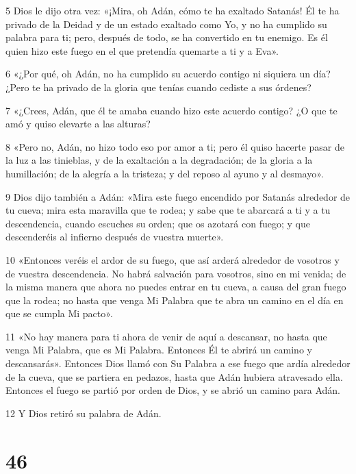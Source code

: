 \par 5 Dios le dijo otra vez: «¡Mira, oh Adán, cómo te ha exaltado Satanás! Él te ha privado de la Deidad y de un estado exaltado como Yo, y no ha cumplido su palabra para ti; pero, después de todo, se ha convertido en tu enemigo. Es él quien hizo este fuego en el que pretendía quemarte a ti y a Eva».

\par 6 «¿Por qué, oh Adán, no ha cumplido su acuerdo contigo ni siquiera un día? ¿Pero te ha privado de la gloria que tenías cuando cediste a sus órdenes?

\par 7 «¿Crees, Adán, que él te amaba cuando hizo este acuerdo contigo? ¿O que te amó y quiso elevarte a las alturas?

\par 8 «Pero no, Adán, no hizo todo eso por amor a ti; pero él quiso hacerte pasar de la luz a las tinieblas, y de la exaltación a la degradación; de la gloria a la humillación; de la alegría a la tristeza; y del reposo al ayuno y al desmayo».

\par 9 Dios dijo también a Adán: «Mira este fuego encendido por Satanás alrededor de tu cueva; mira esta maravilla que te rodea; y sabe que te abarcará a ti y a tu descendencia, cuando escuches su orden; que os azotará con fuego; y que descenderéis al infierno después de vuestra muerte».

\par 10 «Entonces veréis el ardor de su fuego, que así arderá alrededor de vosotros y de vuestra descendencia. No habrá salvación para vosotros, sino en mi venida; de la misma manera que ahora no puedes entrar en tu cueva, a causa del gran fuego que la rodea; no hasta que venga Mi Palabra que te abra un camino en el día en que se cumpla Mi pacto».

\par 11 «No hay manera para ti ahora de venir de aquí a descansar, no hasta que venga Mi Palabra, que es Mi Palabra. Entonces Él te abrirá un camino y descansarás». Entonces Dios llamó con Su Palabra a ese fuego que ardía alrededor de la cueva, que se partiera en pedazos, hasta que Adán hubiera atravesado ella. Entonces el fuego se partió por orden de Dios, y se abrió un camino para Adán.

\par 12 Y Dios retiró su palabra de Adán.

\chapter{46}

